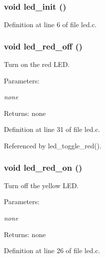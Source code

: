 \subsubsection{\setlength{\rightskip}{0pt plus 5cm}void led\_\-init ()}\label{led_8c_7b3b624857fba1776c75412289a20230}




Definition at line 6 of file led.c.
\subsubsection{\setlength{\rightskip}{0pt plus 5cm}void led\_\-red\_\-off ()}\label{led_8c_d6f6083af3526114311748a49640254f}


Turn on the red LED. 

\begin{Desc}
\item[Parameters:]
\begin{description}
\item[{\em none}]\end{description}
\end{Desc}
\begin{Desc}
\item[Returns:]none \end{Desc}


Definition at line 31 of file led.c.

Referenced by led\_\-toggle\_\-red().
\subsubsection{\setlength{\rightskip}{0pt plus 5cm}void led\_\-red\_\-on ()}\label{led_8c_a08e5b078986d56dfbad555f2fa6fd57}


Turn off the yellow LED. 

\begin{Desc}
\item[Parameters:]
\begin{description}
\item[{\em none}]\end{description}
\end{Desc}
\begin{Desc}
\item[Returns:]none \end{Desc}


Definition at line 26 of file led.c.


